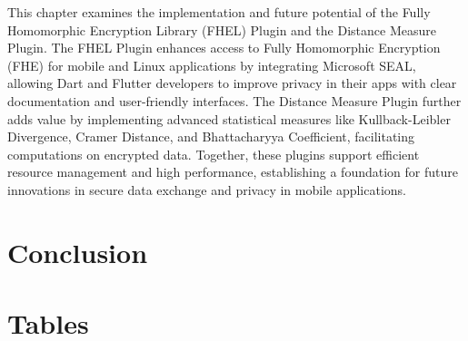 \documentclass [11pt, proquest] {uwthesis}[2020/02/24]
\begin{document}
This chapter examines the implementation and future potential of the Fully Homomorphic Encryption Library (FHEL) Plugin and the Distance Measure Plugin. The FHEL Plugin enhances access to Fully Homomorphic Encryption (FHE) for mobile and Linux applications by integrating Microsoft SEAL, allowing Dart and Flutter developers to improve privacy in their apps with clear documentation and user-friendly interfaces. The Distance Measure Plugin further adds value by implementing advanced statistical measures like Kullback-Leibler Divergence, Cramer Distance, and Bhattacharyya Coefficient, facilitating computations on encrypted data. Together, these plugins support efficient resource management and high performance, establishing a foundation for future innovations in secure data exchange and privacy in mobile applications.






\chapter{Conclusion}


%
%
\nocite{*}   %


%
%
\appendix
\raggedbottom\sloppy
 
 
\chapter{Tables}
 

\end{document}
